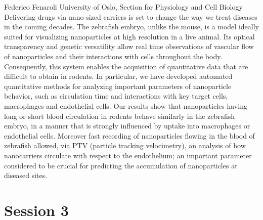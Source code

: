\documentclass{article}
\begin{document}
{Federico Fenaroli}
{University of Oslo, Section for Physiology and Cell Biology}
{Delivering drugs via nano-sized carriers is set to change the way we treat diseases in the coming decades.
The zebrafish embryo, unlike the mouse, is a model ideally suited for visualizing nanoparticles at high
resolution in a live animal. Its optical transparency and genetic versatility allow real time observations of
vascular flow of nanoparticles and their interactions with cells throughout the body. Consequently, this
system enables the acquisition of quantitative data that are difficult to obtain in rodents. In particular, we
have developed automated quantitative methods for analyzing important parameters of nanoparticle behavior,
such as circulation time and interactions with key target cells, macrophages and endothelial cells. Our
results show that nanoparticles having long or short blood circulation in rodents behave similarly in the
zebrafish embryo, in a manner that is strongly influenced by uptake into macrophages or endothelial cells.
Moreover fast recording of nanoparticles flowing in the blood of zebrafish allowed, via PTV
(particle tracking velocimetry), an analysis of how nanocarriers circulate with respect to the endothelium; an
important parameter considered to be crucial for predicting the accumulation of nanoparticles at diseased sites.  }

\newpage
\section*{Session 3}

\end{document}
